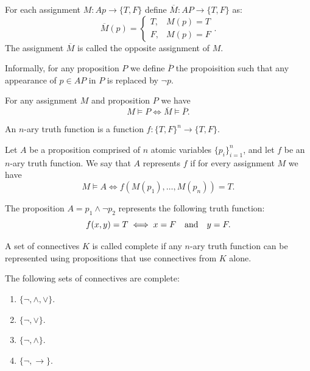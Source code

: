 \documentclass[11pt,a4paper]{article}
\DeclareRobustCommand{\models}{%
  \mathrel{\vDash}%
}
\renewcommand{\implies}{\rightarrow}
\begin{document}
\begin{definition}
  For each assignment $M \colon Ap \to \{T, F\}$ 
  define $\overline M \colon AP \to \{T, F\}$ as:
  \[
    \overline M(p) =
    \begin{cases}
      T, &M(p) = T \\
      F, &M(p) = F
    \end{cases}.
  \]
  The assignment $\overline M$ is called the opposite assignment
  of $M$.
\end{definition}

Informally, for any proposition $P$ we define $\overline P$ the
propoisition such that any appearance of $p \in AP$ in $P$ is
replaced by $\neg p$.

\begin{proposition}
  For any assignment $M$ and proposition $P$ we have
  \[
    M \models P \iff \overline M \models \overline P.
  \]
\end{proposition}

\begin{definition}
  An $n$-ary truth function is a function
  $f \colon \{T, F\}^n \to \{T, F\}$.
\end{definition}

\begin{definition}
  Let $A$ be a proposition comprised of $n$ atomic variables
  $\{p_i\}_{i=1}^{n}$, and let $f$ be an $n$-ary truth function.
  We say that $A$ represents $f$ if for every assignment
  $M$ we have
  \[
    M \models A \iff
    f(M(p_1),\dots,M(p_n)) = T.
  \]
\end{definition}

\begin{example}
  The proposition $A = p_1 \land \neg p_2$ represents the following
  truth function:
  \[
    f(x,y) = T \iff x = F \quad \text{and} \quad y = F.
  \]
\end{example}

\begin{definition}
  A set of connectives $K$ is called complete if any $n$-ary truth
  function can be represented using propositions that use connectives from 
  $K$ alone.
\end{definition}

\begin{proposition}
  The following sets of connectives are complete:
  \begin{enumerate}
    \item[(1)] $\{\neg, \land, \lor\}$.
    \item[(2)] $\{\neg, \lor\}$.
    \item[(3)] $\{\neg, \land\}$.
    \item[(4)] $\{\neg, \implies\}$.
  \end{enumerate}
\end{proposition}
\end{document}
